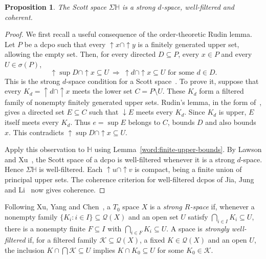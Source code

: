 \documentclass[10pt,a4paper]{article}
\newtheorem{proposition}[theorem]{Proposition}
\theoremstyle{definition}
\newcommand{\HH}{\mathbb H}
\begin{document}
\begin{proposition}\label{word:wellfiltered}
The Scott space $\Sigma\HH$ is a strong $d$-space, well-filtered and coherent.
\end{proposition}
\begin{proof}
We first recall a useful consequence of the order-theoretic Rudin lemma. Let $P$ be a dcpo such that every ${\uparrow} x\cap{\uparrow} y$ is a finitely generated upper set, allowing the empty set. Then, for every directed $D\subseteq P$, every $x\in P$ and every $U\in\sigma(P)$,
\[
 {\uparrow}\sup D\cap{\uparrow} x\subseteq U
 ~\Longrightarrow~
 {\uparrow} d\cap{\uparrow} x\subseteq U
 \text{ for some }d\in D.
\]
This is the strong $d$-space condition for a Scott space~\cite{XZ,LXLower}. To prove it, suppose that every $K_d={\uparrow} d\cap{\uparrow} x$ meets the lower set $C=P\setminus U$. These $K_d$ form a filtered family of nonempty finitely generated upper sets. Rudin's lemma, in the form of~\cite[Lemma~2.3]{LXCompact}, gives a directed set $E\subseteq C$ such that ${\downarrow} E$ meets every $K_d$. Since $K_d$ is upper, $E$ itself meets every $K_d$. Thus $e=\sup E$ belongs to $C$, bounds $D$ and also bounds $x$. This contradicts ${\uparrow}\sup D\cap{\uparrow} x\subseteq U$.

Apply this observation to $\HH$ using Lemma~\ref{word:finite-upper-bounds}. By Lawson and Xu~\cite[Corollary~64]{LXLower}, the Scott space of a dcpo is well-filtered whenever it is a strong $d$-space. Hence $\Sigma\HH$ is well-filtered. Each ${\uparrow} u\cap{\uparrow} v$ is compact, being a finite union of principal upper sets. The coherence criterion for well-filtered dcpos of Jia, Jung and Li~\cite[Lemma~3.1]{JJLCoherence} now gives coherence.
\end{proof}

Following Xu, Yang and Chen~\cite{XXC}, a $T_0$ space $X$ is a \emph{strong $R$-space} if, whenever a nonempty family $\{K_i:i\in I\}\subseteq\mathcal Q(X)$ and an open set $U$ satisfy $\bigcap_{i\in I}K_i\subseteq U$, there is a nonempty finite $F\subseteq I$ with $\bigcap_{i\in F}K_i\subseteq U$. A space is \emph{strongly well-filtered} if, for a filtered family $\mathcal K\subseteq\mathcal Q(X)$, a fixed $K\in\mathcal Q(X)$ and an open $U$, the inclusion $K\cap\bigcap\mathcal K\subseteq U$ implies $K\cap K_0\subseteq U$ for some $K_0\in\mathcal K$.
\end{document}
